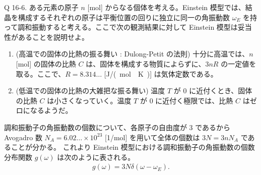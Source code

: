 \documentclass[uplatex,diffipdfmx,a4paper,11pt]{jlreq}
\theoremstyle{definition}
\begin{document}
\begin{itembox}[l]{Q 16-6.}
  ある元素の原子 $n$ [\si{mol}] からなる個体を考える。Einstein 模型では、結晶を構成するそれぞれの原子は平衡位置の回りに独立に同一の角振動数 $\omega_E$ を持って調和振動すると考える。ここで次の観測結果に対して Einstein 模型は妥当性があることを説明せよ。
  \begin{enumerate}
    \item (高温での固体の比熱の振る舞い : Dulong-Petit の法則) 十分に高温では、$n$ [\si{mol}] の固体の比熱 $C$ は、固体を構成する物質によらずに、$3nR$ の一定値を取る。ここで、$R = 8.314\ldots$ [\si{J/(mol\cdot K)}] は気体定数である。
    \item (低温での固体の比熱の大雑把な振る舞い) 温度 $T$ が $0$ に近付くとき、固体の比熱 $C$ は小さくなっていく。温度 $T$ が $0$ に近付く極限では、比熱 $C$ はゼロになるようだ。
  \end{enumerate}
\end{itembox}
調和振動子の角振動数の個数について、各原子の自由度が $3$ であるから Avogadro 数 $N_A = 6.02\ldots\times 10^{23}$ [\si{1/mol}] を用いて全体の個数は $3N = 3nN_A$ であることが分かる。
これより Einstein 模型における調和振動子の角振動数の個数分布関数 $g(\omega)$ は次のように表される。
\begin{align}
  g(\omega) = 3N\delta(\omega - \omega_E).
\end{align}
\end{document}
